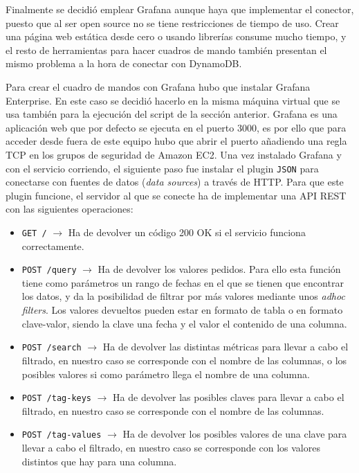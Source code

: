 Finalmente se decidió emplear Grafana aunque haya que implementar el conector, puesto que al ser open source no se tiene restricciones de tiempo de uso. Crear una página web estática desde cero o usando librerías consume mucho tiempo, y el resto de herramientas para hacer cuadros de mando también presentan el mismo problema a la hora de conectar con DynamoDB.

Para crear el cuadro de mandos con Grafana hubo que instalar Grafana Enterprise. En este caso se decidió hacerlo en la misma máquina virtual que se usa también para la ejecución del script de la sección anterior. Grafana es una aplicación web que por defecto se ejecuta en el puerto 3000, es por ello que para acceder desde fuera de este equipo hubo que abrir el puerto añadiendo una regla TCP en los grupos de seguridad de Amazon EC2. Una vez instalado Grafana y con el servicio corriendo, el siguiente paso fue instalar el plugin \texttt{JSON} para conectarse con fuentes de datos (\textit{data sources}) a través de HTTP. Para que este plugin funcione, el servidor al que se conecte ha de implementar una API REST con las siguientes operaciones:

\begin{itemize}
    \item \texttt{GET /} $\rightarrow$ Ha de devolver un código 200 OK si el servicio funciona correctamente.
    \item \texttt{POST /query} $\rightarrow$ Ha de devolver los valores pedidos. Para ello esta función tiene como parámetros un rango de fechas en el que se tienen que encontrar los datos, y da la posibilidad de filtrar por más valores mediante unos \textit{adhoc filters}. Los valores devueltos pueden estar en formato de tabla o en formato clave-valor, siendo la clave una fecha y el valor el contenido de una columna.
    \item \texttt{POST /search} $\rightarrow$ Ha de devolver las distintas métricas para llevar a cabo el filtrado, en nuestro caso se corresponde con el nombre de las columnas, o los posibles valores si como parámetro llega el nombre de una columna.
    \item \texttt{POST /tag-keys} $\rightarrow$ Ha de devolver las posibles claves para llevar a cabo el filtrado, en nuestro caso se corresponde con el nombre de las columnas.
    \item \texttt{POST /tag-values} $\rightarrow$ Ha de devolver los posibles valores de una clave para llevar a cabo el filtrado, en nuestro caso se corresponde con los valores distintos que hay para una columna.
\end{itemize}

